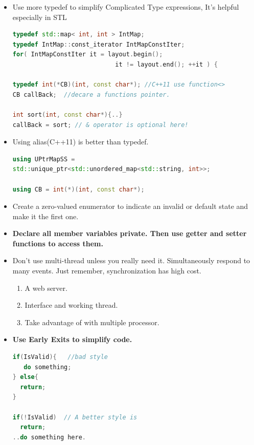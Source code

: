 \documentclass[a4paper,12pt,twoside]{book}
\begin{document}
\begin{itemize}
\item Use more typedef to simplify Complicated Type expressions, It's helpful especially in STL
 \begin{lstlisting}[frame=single, language=c++]
typedef std::map< int, int > IntMap;
typedef IntMap::const_iterator IntMapConstIter;
for( IntMapConstIter it = layout.begin();
                            it != layout.end(); ++it ) {

typedef int(*CB)(int, const char*); //C++11 use function<>
CB callBack;  //decare a functions pointer.

int sort(int, const char*){..}
callBack = sort; // & operator is optional here!
\end{lstlisting}

\item Using alias(C++11) is better than typedef.
\begin{lstlisting}[frame=single, language=c++]
using UPtrMapSS =
std::unique_ptr<std::unordered_map<std::string, int>>;

using CB = int(*)(int, const char*);
\end{lstlisting}

\item Create a zero-valued enumerator to indicate an invalid or default state and make it the first one.

\item \textbf{Declare all member variables private. Then use getter and setter functions to access them.}

\item Don't use multi-thread unless you really need it. Simultaneously respond to many events. Just remember, synchronization has high cost.
\begin{enumerate}
\item A web server.
\item Interface and working thread.
\item Take advantage of with multiple processor.
\end{enumerate}

\item \textbf{Use Early Exits to simplify code.}

\begin{lstlisting}[frame=single, language=c++]
if(IsValid){   //bad style
   do something;
} else{
  return;
}

if(!IsValid)  // A better style is
  return;
..do something here.
\end{lstlisting}


\end{itemize}
\end{document}
